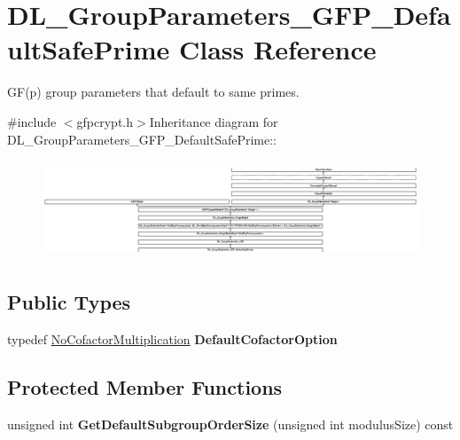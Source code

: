 \hypertarget{class_d_l___group_parameters___g_f_p___default_safe_prime}{
\section{DL\_\-GroupParameters\_\-GFP\_\-DefaultSafePrime Class Reference}
\label{class_d_l___group_parameters___g_f_p___default_safe_prime}
}


GF(p) group parameters that default to same primes.  


{\ttfamily \#include $<$gfpcrypt.h$>$}Inheritance diagram for DL\_\-GroupParameters\_\-GFP\_\-DefaultSafePrime::\begin{figure}[H]
\begin{center}
\leavevmode
\includegraphics[height=2.94455cm]{class_d_l___group_parameters___g_f_p___default_safe_prime}
\end{center}
\end{figure}
\subsection*{Public Types}
\begin{DoxyCompactItemize}
\item 
\hypertarget{class_d_l___group_parameters___g_f_p___default_safe_prime_a293711b516f4d541ae51ba701b26fb34}{
typedef \hyperlink{struct_enum_to_type}{NoCofactorMultiplication} {\bfseries DefaultCofactorOption}}
\label{class_d_l___group_parameters___g_f_p___default_safe_prime_a293711b516f4d541ae51ba701b26fb34}

\end{DoxyCompactItemize}
\subsection*{Protected Member Functions}
\begin{DoxyCompactItemize}
\item 
\hypertarget{class_d_l___group_parameters___g_f_p___default_safe_prime_adec422717a7665d12b9a351727147ebe}{
unsigned int {\bfseries GetDefaultSubgroupOrderSize} (unsigned int modulusSize) const }
\label{class_d_l___group_parameters___g_f_p___default_safe_prime_adec422717a7665d12b9a351727147ebe}

\end{DoxyCompactItemize}


